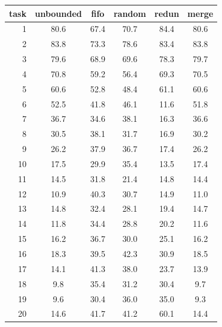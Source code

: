 \begin{tabular}{rccccc}
\toprule
task & unbounded & fifo & random & redun & merge \\
\midrule
1 & 80.6 & 67.4 & 70.7 & 84.4 & 80.6 \\
2 & 83.8 & 73.3 & 78.6 & 83.4 & 83.8 \\
3 & 79.6 & 68.9 & 69.6 & 78.3 & 79.7 \\
4 & 70.8 & 59.2 & 56.4 & 69.3 & 70.5 \\
5 & 60.6 & 52.8 & 48.4 & 61.1 & 60.6 \\
6 & 52.5 & 41.8 & 46.1 & 11.6 & 51.8 \\
7 & 36.7 & 34.6 & 38.1 & 16.3 & 36.6 \\
8 & 30.5 & 38.1 & 31.7 & 16.9 & 30.2 \\
9 & 26.2 & 37.9 & 36.7 & 17.4 & 26.2 \\
10 & 17.5 & 29.9 & 35.4 & 13.5 & 17.4 \\
11 & 14.5 & 31.8 & 21.4 & 14.8 & 14.4 \\
12 & 10.9 & 40.3 & 30.7 & 14.9 & 11.0 \\
13 & 14.8 & 32.4 & 28.1 & 19.4 & 14.7 \\
14 & 11.8 & 34.4 & 28.8 & 20.2 & 11.6 \\
15 & 16.2 & 36.7 & 30.0 & 25.1 & 16.2 \\
16 & 18.3 & 39.5 & 42.3 & 30.9 & 18.5 \\
17 & 14.1 & 41.3 & 38.0 & 23.7 & 13.9 \\
18 & 9.8 & 35.4 & 31.2 & 30.4 & 9.7 \\
19 & 9.6 & 30.4 & 36.0 & 35.0 & 9.3 \\
20 & 14.6 & 41.7 & 41.2 & 60.1 & 14.4 \\
\bottomrule
\end{tabular}
